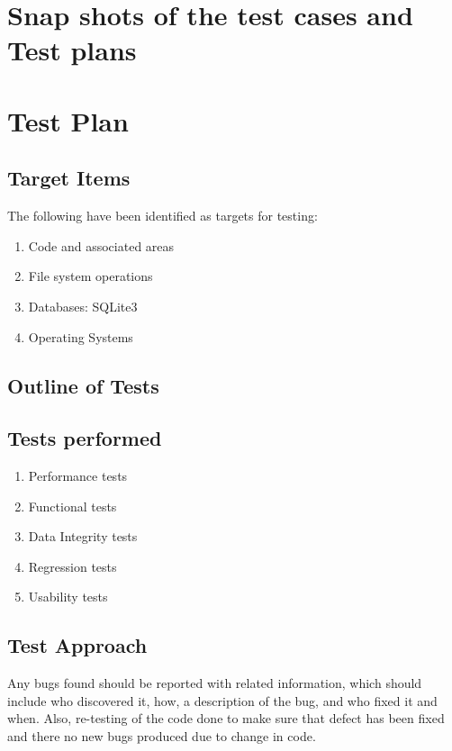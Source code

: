\section{Snap shots of the test cases and Test plans}
\section*{Test Plan}
\subsection{Target Items}
The following have been identified as targets for testing:
\begin{enumerate}
\item Code and associated areas
\item File system operations
\item Databases: SQLite3
\item Operating Systems
\end{enumerate}

\subsection{Outline of Tests}
\subsection*{Tests performed}
\begin{enumerate}
\item Performance tests
\item Functional tests
\item Data Integrity tests
\item Regression tests
\item Usability tests
\end{enumerate}

\subsection{Test Approach}
Any bugs found should be reported with related information, which should include
who discovered it, how, a description of the bug, and who fixed it and
when. Also, re-testing of the code done to make sure that defect has been fixed
and there no new bugs produced due to change in code.

